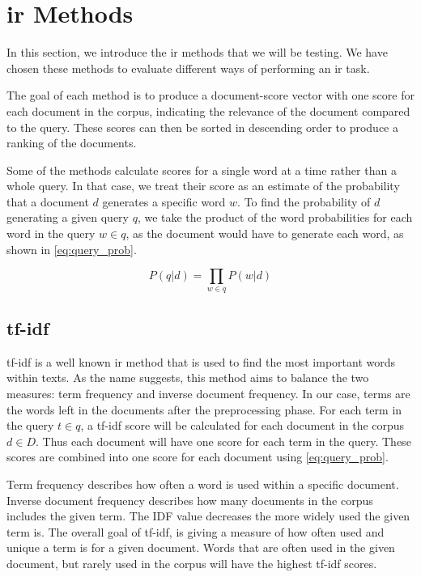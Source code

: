 \section{\acrlong{ir} Methods}\label{sec:ir_methods}

In this section, we introduce the \gls{ir} methods that we will be testing.
We have chosen these methods to evaluate different ways of performing an \acrfull{ir} task.

The goal of each method is to produce a document-score vector with one score for each document in the corpus, indicating the relevance of the document compared to the query.
These scores can then be sorted in descending order to produce a ranking of the documents.

Some of the methods calculate scores for a single word at a time rather than a whole query.
In that case, we treat their score as an estimate of the probability that a document $d$ generates a specific word $w$.
To find the probability of $d$ generating a given query $q$, we take the product of the word probabilities for each word in the query $w \in q$, as the document would have to generate each word, as shown in \autoref{eq:query_prob}.

\begin{equation}\label{eq:query_prob}
	P(q|d) = \prod_{w \in q} P(w|d)
\end{equation}





\subsection{\acrlong{tf-idf}}
\acrfull{tf-idf} is a well known \gls{ir} method that is used to find the most important words within texts.
As the name suggests, this method aims to balance the two measures: term frequency and inverse document frequency.
In our case, terms are the words left in the documents after the preprocessing phase.
For each term in the query $t \in q$, a \gls{tf-idf} score will be calculated for each document in the corpus $d \in D$.
Thus each document will have one score for each term in the query.
These scores are combined into one score for each document using \autoref{eq:query_prob}.


Term frequency describes how often a word is used within a specific document.
Inverse document frequency describes how many documents in the corpus includes the given term.
The IDF value decreases the more widely used the given term is.
The overall goal of \gls{tf-idf}, is giving a measure of how often used and unique a term is for a given document. Words that are often used in the given document, but rarely used in the corpus will have the highest \gls{tf-idf} scores.

